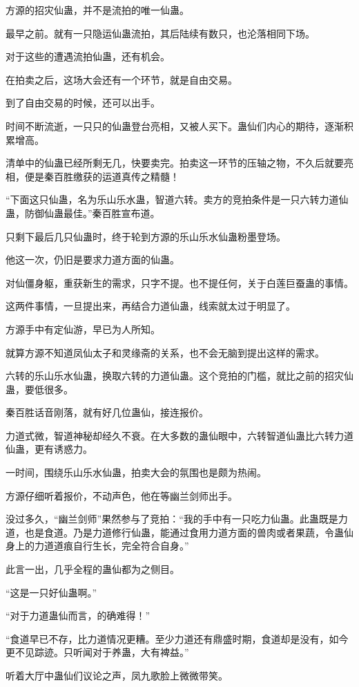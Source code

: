 \begin{this_body}
方源的招灾仙蛊，并不是流拍的唯一仙蛊。

最早之前。就有一只隐运仙蛊流拍，其后陆续有数只，也沦落相同下场。

对于这些的遭遇流拍仙蛊，还有机会。

在拍卖之后，这场大会还有一个环节，就是自由交易。

到了自由交易的时候，还可以出手。

时间不断流逝，一只只的仙蛊登台亮相，又被人买下。蛊仙们内心的期待，逐渐积累增高。

清单中的仙蛊已经所剩无几，快要卖完。拍卖这一环节的压轴之物，不久后就要亮相，便是秦百胜缴获的运道真传之精髓！

“下面这只仙蛊，名为乐山乐水蛊，智道六转。卖方的竞拍条件是一只六转力道仙蛊，防御仙蛊最佳。”秦百胜宣布道。

只剩下最后几只仙蛊时，终于轮到方源的乐山乐水仙蛊粉墨登场。

他这一次，仍旧是要求力道方面的仙蛊。

对仙僵身躯，重获新生的需求，只字不提。也不提任何，关于白莲巨蚕蛊的事情。

这两件事情，一旦提出来，再结合力道仙蛊，线索就太过于明显了。

方源手中有定仙游，早已为人所知。

就算方源不知道凤仙太子和灵缘斋的关系，也不会无脑到提出这样的需求。

六转的乐山乐水仙蛊，换取六转的力道仙蛊。这个竞拍的门槛，就比之前的招灾仙蛊，要低很多。

秦百胜话音刚落，就有好几位蛊仙，接连报价。

力道式微，智道神秘却经久不衰。在大多数的蛊仙眼中，六转智道仙蛊比六转力道仙蛊，更有诱惑力。

一时间，围绕乐山乐水仙蛊，拍卖大会的氛围也是颇为热闹。

方源仔细听着报价，不动声色，他在等幽兰剑师出手。

没过多久，“幽兰剑师”果然参与了竞拍：“我的手中有一只吃力仙蛊。此蛊既是力道，也是食道。乃是力道修行仙蛊，能通过食用力道方面的兽肉或者果蔬，令蛊仙身上的力道道痕自行生长，完全符合自身。”

此言一出，几乎全程的蛊仙都为之侧目。

“这是一只好仙蛊啊。”

“对于力道蛊仙而言，的确难得！”

“食道早已不存，比力道情况更糟。至少力道还有鼎盛时期，食道却是没有，如今更不见踪迹。只听闻对于养蛊，大有裨益。”

听着大厅中蛊仙们议论之声，凤九歌脸上微微带笑。


\end{this_body}
